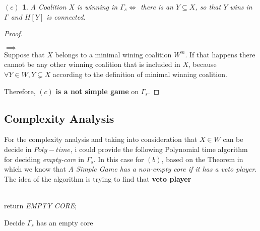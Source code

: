 \documentclass[12pt, a4paper]{article}
\begin{document}
\newtheorem{case_c}{$(c)$}
\newtheorem{proofpart_c}{Part}
\begin{case_c}
  A Coalition $X$ is winning in $\Gamma_s \iff$ there is an $Y \subseteq X$, so that $Y$ wins in $\Gamma$ and $H[Y]$ is connected.
\end{case_c}

\begin{proof}
\begin{proofpart}
$\implies$\\
Suppose that $X$ belongs to a minimal wining coalition $W^m$. If that happens there cannot be any other winning coalition that is included in $X$, 
because $\forall Y \in W, Y \subsetneq X$ according to the definition of minimal winning coalition.
\end{proofpart}

Therefore, $(c)$ \textbf{is a not simple game} on $\Gamma_s$.
\end{proof}

\subsection{Complexity Analysis}
For the complexity analysis and taking into consideration that $X \in W$ can be decide in $Poly-time$, i could provide the following Polynomial time algorithm for deciding \textit{empty-core} in $\Gamma_s$. In this case for $(b)$,
based on the Theorem in which we know that \textit{A Simple Game has a non-empty core if it has a veto player}.
The idea of the algorithm is trying to find that \textbf{veto player}

\begin{algorithm}[H]
  \\
  return \emph{EMPTY CORE};
  \caption{Decide $\Gamma_s$ has an empty core}
\end{algorithm}
\end{document}
